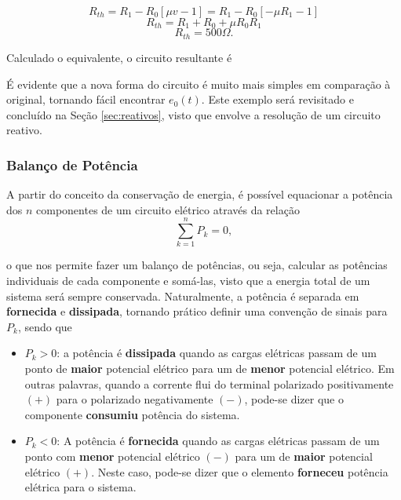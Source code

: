 \documentclass{article}
\numberwithin{equation}{section}
\begin{document}
$$R_{th}=R_1-R_0[\mu v-1]=R_1-R_0[-\mu R_1-1]$$
$$R_{th}=R_1+R_0+\mu R_0R_1$$
$$R_{th}=500 \Omega.$$

\noindent Calculado o equivalente, o circuito resultante é

\begin{center}
\end{center}

\noindent É evidente que a nova forma do circuito é muito mais simples em comparação à original, tornando fácil encontrar $e_0(t)$. Este exemplo será revisitado e concluído na Seção \ref{sec:reativos}, visto que envolve a resolução de um circuito reativo.

\subsubsection{Balanço de Potência}
\label{subsubsec:balancodepot}
A partir do conceito da conservação de energia, é possível equacionar a potência dos $n$ componentes de um circuito elétrico através da relação
\begin{equation}
    \sum_{k=1}^{n} P_k = 0,
\end{equation}

\noindent o que nos permite fazer um balanço de potências, ou seja, calcular as potências individuais de cada componente e somá-las, visto que a energia total de um sistema será sempre conservada. Naturalmente, a potência é separada em \textbf{fornecida} e \textbf{dissipada}, tornando prático definir uma convenção de sinais para $P_k$, sendo que
\begin{itemize}
    \item \hspace{0.2cm} $P_k > 0$: a potência é \textbf{dissipada} quando as cargas elétricas passam de um ponto de \textbf{maior} potencial elétrico para um de \textbf{menor} potencial elétrico. Em outras palavras, quando a corrente flui do terminal polarizado positivamente $(+)$ para o polarizado negativamente $(-)$, pode-se dizer que o componente \textbf{consumiu} potência do sistema.
    \item \hspace{0.2cm} $P_k < 0$: A potência é \textbf{fornecida} quando as cargas elétricas passam de um ponto com \textbf{menor} potencial elétrico $(-)$ para um de \textbf{maior} potencial elétrico $(+)$. Neste caso, pode-se dizer que o elemento \textbf{forneceu} potência elétrica para o sistema.
\end{itemize}
\end{document}
